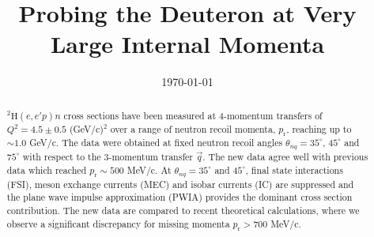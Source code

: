 \documentclass[aps,prl,twocolumn,showpacs,superscriptaddress,groupedaddress,nofootinbib]{revtex4-2}  %
\begin{document}
\title{Probing the Deuteron at Very Large Internal Momenta}



\date{\today}

\begin{abstract}
  $^{2}\mathrm{H}(e,e'p)n$ cross sections have been measured at 4-momentum transfers of $Q^{2} = 4.5 \pm 0.5$ (GeV/c)$^{2}$
  over a range of neutron recoil momenta, $p_{\mathrm{r}}$,  reaching up to $\sim1.0$ GeV/c. The data were
  obtained at fixed neutron recoil angles $\theta_{nq} = 35^\circ$, $45^\circ$ and $75^{\circ}$  with respect to the 3-momentum
  transfer $\vec q$. The new data agree well with previous data which reached $p_{\mathrm{r}}\sim500$ MeV/c. At $\theta_{nq} = 35^\circ$
  and $45^\circ$, final state interactions (FSI), meson exchange currents (MEC) and isobar currents (IC) are suppressed and
  the plane wave impulse approximation (PWIA) provides the dominant cross section contribution. The new data are compared to recent
  theoretical calculations, where we observe a significant discrepancy for missing momenta $p_{\mathrm{r}}>700$ MeV/c. 
\end{abstract}

\end{document}
